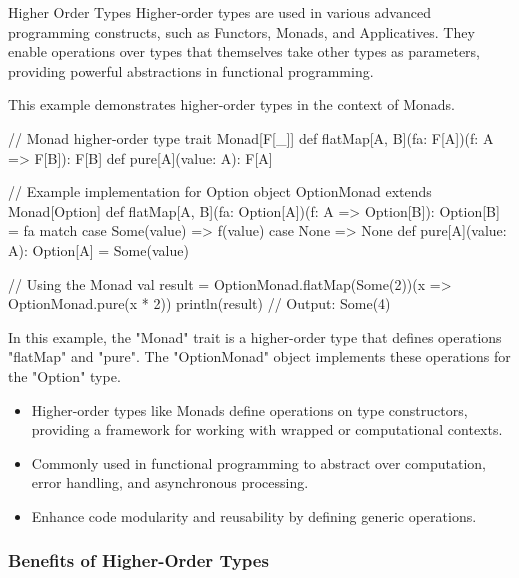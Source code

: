 \begin{notes}{Higher Order Types}
    Higher-order types are used in various advanced programming constructs, such as Functors, Monads, and Applicatives. They enable operations over types that themselves take other types as parameters, 
    providing powerful abstractions in functional programming.
    
    \begin{highlight}
    
        This example demonstrates higher-order types in the context of Monads.
    
    \begin{code}[Scala]
    // Monad higher-order type
    trait Monad[F[_]] {
        def flatMap[A, B](fa: F[A])(f: A => F[B]): F[B]
        def pure[A](value: A): F[A]
    }
    
    // Example implementation for Option
    object OptionMonad extends Monad[Option] {
        def flatMap[A, B](fa: Option[A])(f: A => Option[B]): Option[B] = fa match {
            case Some(value) => f(value)
            case None => None
        }
        def pure[A](value: A): Option[A] = Some(value)
    }
    
    // Using the Monad
    val result = OptionMonad.flatMap(Some(2))(x => OptionMonad.pure(x * 2))
    println(result)  // Output: Some(4)
    \end{code}
    
        In this example, the "Monad" trait is a higher-order type that defines operations "flatMap" and "pure". The "OptionMonad" object implements these operations for the "Option" type.
    
        \begin{itemize}
            \item Higher-order types like Monads define operations on type constructors, providing a framework for working with wrapped or computational contexts.
            \item Commonly used in functional programming to abstract over computation, error handling, and asynchronous processing.
            \item Enhance code modularity and reusability by defining generic operations.
        \end{itemize}
    
    \end{highlight}
    
    \subsubsection*{Benefits of Higher-Order Types}
    

\end{notes}
